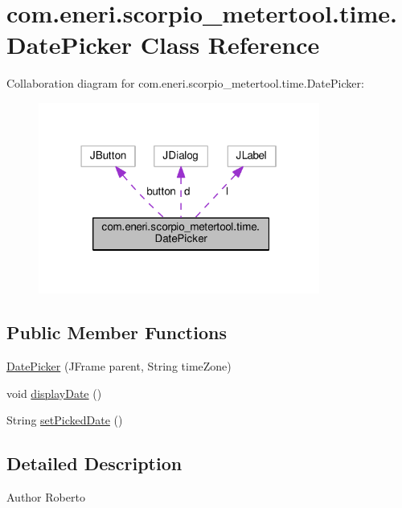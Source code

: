 \hypertarget{classcom_1_1eneri_1_1scorpio__metertool_1_1time_1_1_date_picker}{}\section{com.\+eneri.\+scorpio\+\_\+metertool.\+time.\+Date\+Picker Class Reference}
\label{classcom_1_1eneri_1_1scorpio__metertool_1_1time_1_1_date_picker}


Collaboration diagram for com.\+eneri.\+scorpio\+\_\+metertool.\+time.\+Date\+Picker\+:
\nopagebreak
\begin{figure}[H]
\begin{center}
\leavevmode
\includegraphics[width=262pt]{classcom_1_1eneri_1_1scorpio__metertool_1_1time_1_1_date_picker__coll__graph}
\end{center}
\end{figure}
\subsection*{Public Member Functions}
\begin{DoxyCompactItemize}
\item 
\hyperlink{classcom_1_1eneri_1_1scorpio__metertool_1_1time_1_1_date_picker_a2a2e7d1ab862efbdacc0285c249a6ca0}{Date\+Picker} (J\+Frame parent, String time\+Zone)
\item 
void \hyperlink{classcom_1_1eneri_1_1scorpio__metertool_1_1time_1_1_date_picker_a11661ecd710a67608ec96bd79ef09b7e}{display\+Date} ()
\item 
String \hyperlink{classcom_1_1eneri_1_1scorpio__metertool_1_1time_1_1_date_picker_ad4e83128f4402848acd38feaa10569cf}{set\+Picked\+Date} ()
\end{DoxyCompactItemize}


\subsection{Detailed Description}
\begin{DoxyAuthor}{Author}
Roberto 
\end{DoxyAuthor}



